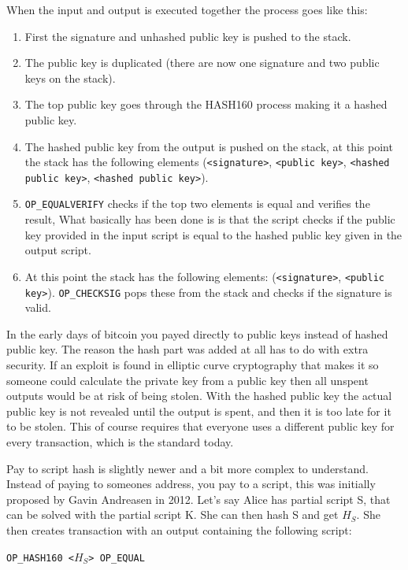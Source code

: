 When the input and output is executed together the process goes like this: 
\begin{enumerate}
	\item First the signature and unhashed public key is pushed to the stack.
	\item The public key is duplicated (there are now one signature and two public keys on the stack).
	\item The top public key goes through the HASH160 process making it a hashed public key.
	\item The hashed public key from the output is pushed on the stack, at this point the stack has the following elements (\texttt{<signature>}, \texttt{<public key>}, \texttt{<hashed public key>}, \texttt{<hashed public key>}).
	\item \texttt{OP\_EQUALVERIFY} checks if the top two elements is equal and verifies the result, What basically has been done is is that the script checks if the public key provided in the input script is equal to the hashed public key given in the output script.
	\item At this point the stack has the following elements: (\texttt{<signature>}, \texttt{<public key>}). \texttt{OP\_CHECKSIG} pops these from the stack and checks if the signature is valid.
\end{enumerate}

In the early days of bitcoin you payed directly to public keys instead of hashed public key. The reason the hash part was added at all has to do with extra security. If an exploit is found in elliptic curve cryptography that makes it so someone could calculate the private key from a public key then all unspent outputs would be at risk of being stolen. With the hashed public key the actual public key is not revealed until the output is spent, and then it is too late for it to be stolen. This of course requires that everyone uses a different public key for every transaction, which is the standard today.\cite{bitcoin_core_tx}

Pay to script hash is slightly newer and a bit more complex to understand. Instead of paying to someones address, you pay to a script, this was initially proposed by Gavin Andreasen in 2012.\cite{scripthash} Let's say Alice has partial script S, that can be solved with the partial script K. She can then hash S and get $H_S$. She then creates transaction with an output containing the following script:

\texttt{OP\_HASH160 <$H_S$> OP\_EQUAL}

